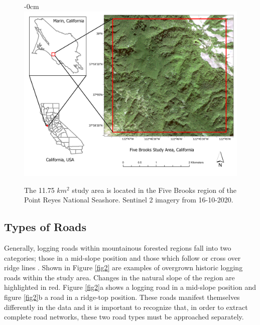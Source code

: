\documentclass[remotesensing,article,submit,pdftex,moreauthors]{Definitions/mdpi}
\begin{document}
\begin{figure}[H]	
\begin{adjustwidth}{-\extralength}{0cm}
\centering
\includegraphics[width=15 cm]{LayoutBrooks.png}
\end{adjustwidth}
\caption{The 11.75 $km^2$ study area is located in the Five Brooks region of the Point Reyes National Seashore. Sentinel 2 imagery from 16-10-2020.\label{fig1}}
\end{figure}  

\subsection{Types of Roads}
Generally, logging roads within mountainous forested regions fall into two categories; those in a mid-slope position and those which follow or cross over ridge lines \cite{sherba}. Shown in Figure \ref{fig2} are examples of overgrown historic logging roads within the study area. Changes in the natural slope of the region are highlighted in red. Figure \ref{fig2}a shows a logging road in a mid-slope position and figure \ref{fig2}b a road in a ridge-top position. These roads manifest themselves differently in the data and it is important to recognize that, in order to extract complete road networks, these two road types must be approached separately.
\end{document}
